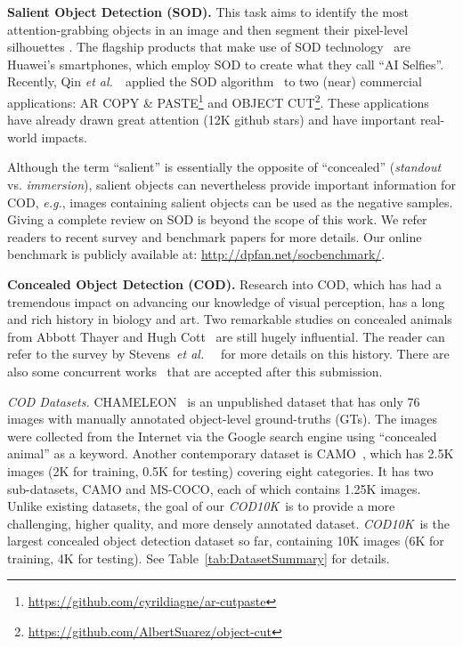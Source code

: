 \documentclass[10pt,journal,compsoc]{IEEEtran}
\def\eg{\emph{e.g.}}
\def\etal{{\em et al.~}}
\newcommand{\myPara}[1]{\vspace{6pt}\noindent\textbf{#1}\qquad }
\newcommand{\tabref}[1]{Table~\ref{#1}}
\def\ourdataset{\textit{COD10K}}
\begin{document}
\myPara{Salient Object Detection (SOD).}
This task aims to identify the most attention-grabbing objects
in an image and then segment their pixel-level silhouettes
\cite{itti1998model,ChengPAMI,GaoEccv20Sal100K}.
The flagship products that make use of SOD technology~\cite{HouPami19Dss} are 
Huawei's smartphones, 
which employ SOD \cite{HouPami19Dss} to create what they call ``AI Selfies''. 
Recently, Qin \etal~applied the SOD algorithm~\cite{qin2021BAS} to two (near)
commercial applications: AR COPY \& PASTE\footnote{
\url{https://github.com/cyrildiagne/ar-cutpaste}} 
and OBJECT CUT\footnote{\url{https://github.com/AlbertSuarez/object-cut}}.
These applications have already drawn great attention 
(12K github stars) and have important real-world impacts.

Although the term ``salient'' is essentially the opposite of ``concealed'' 
(\emph{standout} vs. \emph{immersion}),
salient objects can nevertheless provide important information for COD,
\eg, images containing salient objects can be used as the negative samples.
Giving a complete review on SOD is beyond the scope of this work. 
We refer readers to recent survey and benchmark papers
\cite{Fan2021SOC,borji2015salient,wang2019salient,BorjiCVM2019} 
for more details. Our online benchmark is publicly available at: 
\url{http://dpfan.net/socbenchmark/}. 


\myPara{Concealed Object Detection (COD).}
Research into COD, which has had a tremendous impact on advancing our knowledge of 
visual perception, has a long and rich history in biology and art.
Two remarkable studies on concealed animals from Abbott Thayer
\cite{thayer1909concealing} and Hugh Cott~\cite{cott1940adaptive}
are still hugely influential. 
The reader can refer to the survey by Stevens~\etal~\cite{stevens2008animal} 
for more details on this history. 
There are also some concurrent works~\cite{zhai2021Mutual,Lyu2021Mutual,mei2021Ming} 
that are accepted after this submission.

\textit{COD Datasets.}
CHAMELEON~\cite{2018Animal} is an unpublished dataset that has only 76 images 
with manually annotated object-level ground-truths (GTs).
The images were collected from the Internet via the Google search engine using
``concealed animal'' as a keyword.
Another contemporary dataset is CAMO~\cite{le2019anabranch}, which has
2.5K images (2K for training, 0.5K for testing) covering eight categories.
It has two sub-datasets, CAMO and MS-COCO, each of which contains 1.25K images.
Unlike existing datasets, the goal of our \ourdataset~is to provide 
a more challenging, higher quality, and more densely annotated dataset.
\ourdataset~is the largest concealed object detection dataset
so far, containing 10K images (6K for training, 4K for testing).
See \tabref{tab:DatasetSummary} for details.
\end{document}

